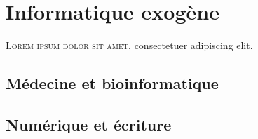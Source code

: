 \chapter[Informatique exogène]{Informatique exogène}
\label{chap:IV}

\lettrine{L}{orem ipsum dolor sit amet}, consectetuer adipiscing elit. 
\lipsum[2]


\section[Médecine et bioinformatique]{Médecine et bioinformatique}
\label{sec:IV.1}

\lipsum[4-5]



\subsection[]{}
\label{sub:IV.1.1}

\lipsum[6-12]

\subsubsection[]{}
\label{subsub:IV.1.1.1}


\subsubsection[]{}
\label{subsub:IV.1.1.2}



\subsection[]{}
\label{sub:IV.1.2}










\section[Numérique et écriture]{Numérique et écriture}
\label{sec:IV.2}



\subsection[]{}
\label{sub:IV.2.1}



